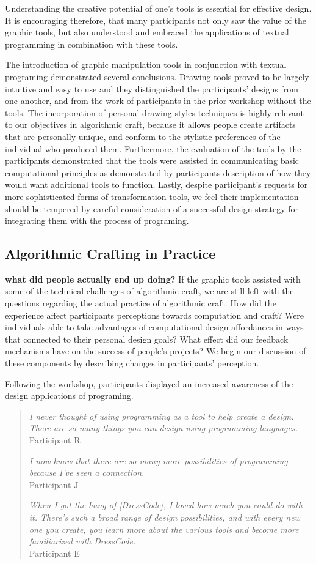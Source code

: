 \documentclass{sigchi}
\begin{document}
Understanding the creative potential of one's tools is essential for effective design. It is encouraging therefore, that many participants not only saw the value of the graphic tools, but also understood and embraced the applications of textual programming in combination with these tools. 

The introduction of graphic manipulation tools in conjunction with textual programing demonstrated several conclusions. Drawing tools proved to be largely intuitive and easy to use and they distinguished the participants' designs from one another, and from the work of participants in the prior workshop without the tools. The incorporation of personal drawing styles techniques is highly relevant to our objectives in algorithmic craft, because it allows people create artifacts that are personally unique, and conform to the stylistic preferences of the individual who produced them. Furthermore, the evaluation of the tools by the participants demonstrated that the tools were assisted in communicating basic computational principles as demonstrated by participants description of how they would want additional tools to function. Lastly, despite participant's requests for more sophisticated forms of transformation tools, we feel their implementation should be tempered by careful consideration of a successful design strategy for integrating them with the process of programing. 

\subsection{Algorithmic Crafting in Practice}
\textbf{what did people actually end up doing?}
If the graphic tools assisted with some of the technical challenges of algorithmic craft, we are still left with the questions regarding the actual practice of algorithmic craft. How did the experience affect participants perceptions towards computation and craft? Were individuals able to take advantages of computational design affordances in ways that connected to their personal design goals? What effect did our feedback mechanisms have on the success of people's projects? We begin our discussion of these components by describing changes in participants' perception. 

Following the workshop, participants displayed an increased awareness of the design applications of programing. 
\begin{quotation}
		\textit{I never thought of using programming as a tool to help create a design. There are so many things you can design using programming languages.}
		\\Participant R
		
		\textit{I now know that there are so many more possibilities of programming because I've seen a connection.}
		\\Participant J
		
		\textit{When I got the hang of [DressCode], I loved how much you could do with it. There's such a broad range of design possibilities, and with every new one you create, you learn more about the various tools and become more familiarized with DressCode.}
		\\Participant E
\end{quotation}
\end{document}
